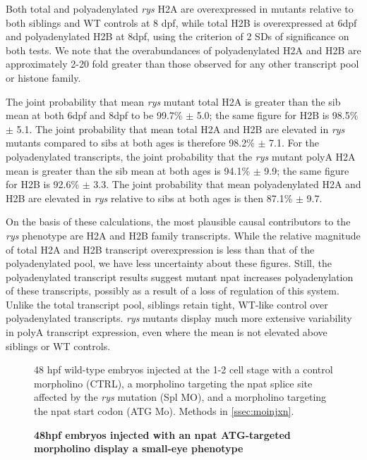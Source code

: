 Both total and polyadenylated \textit{rys} H2A are overexpressed in mutants relative to both siblings and WT controls at 8 dpf, while total H2B is overexpressed at 6dpf and polyadenylated H2B at 8dpf, using the criterion of 2 SDs of significance on both tests. We note that the overabundances of polyadenylated H2A and H2B are approximately 2-20 fold greater than those observed for any other transcript pool or histone family. 

The joint probability that mean \textit{rys} mutant total H2A is greater than the sib mean at both 6dpf and 8dpf to be 99.7\% $\pm$ 5.0; the same figure for H2B is 98.5\% $\pm$ 5.1. The joint probability that mean total H2A and H2B are elevated in \textit{rys} mutants compared to sibs at both ages is therefore 98.2\% $\pm$ 7.1. For the polyadenylated transcripts, the joint probability that the \textit{rys} mutant polyA H2A mean is greater than the sib mean at both ages is 94.1\% $\pm$ 9.9; the same figure for H2B is 92.6\% $\pm$ 3.3. The joint probability that mean polyadenylated H2A and H2B are elevated in \textit{rys} relative to sibs at both ages is then 87.1\% $\pm$ 9.7. 

On the basis of these calculations, the most plausible causal contributors to the \textit{rys} phenotype are H2A and H2B family transcripts. While the relative magnitude of total H2A and H2B transcript overexpression is less than that of the polyadenylated pool, we have less uncertainty about these figures. Still, the polyadenylated transcript results suggest mutant npat increases polyadenylation of these transcripts, possibly as a result of a loss of regulation of this system. Unlike the total transcript pool, siblings retain tight, WT-like control over polyadenylated transcripts. \textit{rys} mutants display much more extensive variability in polyA transcript expression, even where the mean is not elevated above siblings or WT controls.

\begin{figure}[!h]
    \caption{{\bf 48hpf embryos injected with an npat ATG-targeted morpholino display a small-eye phenotype}}
    48 hpf wild-type embryos injected at the 1-2 cell stage with a control morpholino (CTRL), a morpholino targeting the npat splice site affected by the \textit{rys} mutation (Spl MO), and a morpholino targeting the npat start codon (ATG Mo).
    Methods in \autoref{ssec:moinjxn}.
    \label{morpholinopics}
\end{figure}

